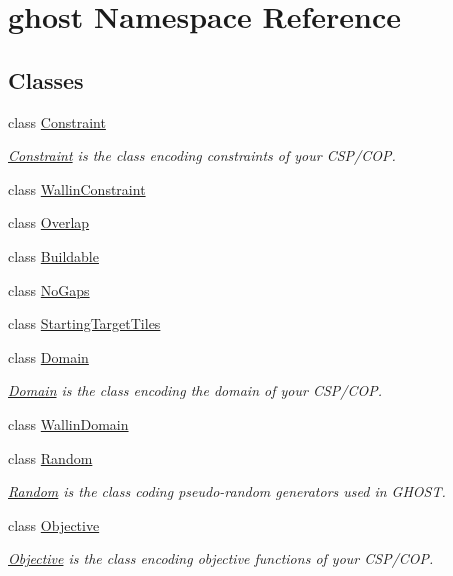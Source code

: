 \hypertarget{namespaceghost}{\section{ghost Namespace Reference}
\label{namespaceghost}
}
\subsection*{Classes}
\begin{DoxyCompactItemize}
\item 
class \hyperlink{classghost_1_1Constraint}{Constraint}
\begin{DoxyCompactList}\small\item\em \hyperlink{classghost_1_1Constraint}{Constraint} is the class encoding constraints of your C\-S\-P/\-C\-O\-P. \end{DoxyCompactList}\item 
class \hyperlink{classghost_1_1WallinConstraint}{Wallin\-Constraint}
\item 
class \hyperlink{classghost_1_1Overlap}{Overlap}
\item 
class \hyperlink{classghost_1_1Buildable}{Buildable}
\item 
class \hyperlink{classghost_1_1NoGaps}{No\-Gaps}
\item 
class \hyperlink{classghost_1_1StartingTargetTiles}{Starting\-Target\-Tiles}
\item 
class \hyperlink{classghost_1_1Domain}{Domain}
\begin{DoxyCompactList}\small\item\em \hyperlink{classghost_1_1Domain}{Domain} is the class encoding the domain of your C\-S\-P/\-C\-O\-P. \end{DoxyCompactList}\item 
class \hyperlink{classghost_1_1WallinDomain}{Wallin\-Domain}
\item 
class \hyperlink{classghost_1_1Random}{Random}
\begin{DoxyCompactList}\small\item\em \hyperlink{classghost_1_1Random}{Random} is the class coding pseudo-\/random generators used in G\-H\-O\-S\-T. \end{DoxyCompactList}\item 
class \hyperlink{classghost_1_1Objective}{Objective}
\begin{DoxyCompactList}\small\item\em \hyperlink{classghost_1_1Objective}{Objective} is the class encoding objective functions of your C\-S\-P/\-C\-O\-P. \end{DoxyCompactList}\item 

\end{DoxyCompactItemize}
